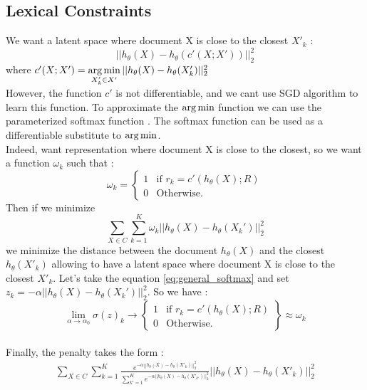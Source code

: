 \subsection{Lexical Constraints}
We want a latent space where document X is close to the closest
$X'_k$ : 
\begin{equation}
|| h_\theta(X) - h_\theta(c'(X ; X' )) ||_2^2
\end{equation}
where $c'(X ; X') = \operatorname*{arg\,min}\limits_{X'_k \in X'} ||h_\theta(X) - h_\theta(X'_k) ||_2^2$\\ 
However, the  function $c'$ is not differentiable, and we cant use SGD algorithm
\cite{doi:10.1080/01621459.1982.10477894}
to learn this function. To approximate the $\operatorname*{arg\,min}$ function we can use the 
parameterized softmax function \cite{doi:10.1117/1.2819119}. The softmax 
function can be used as a differentiable substitute to $\operatorname*{arg\,min}$.
\\Indeed, want representation where document X is close to the closest, so we 
want a function $\omega_k$ such that :
\begin{equation}
\omega_k = \left\{
\begin{array}{ll}
  1 & \mbox{if } r_k = c'(h_\theta(X); R)\\
  0 & \mbox{Otherwise.}
\end{array}
\right.
\end{equation}
Then if we minimize 
\begin{equation}
\sum\limits_{X \in C} \sum\limits_{k = 1}^K \omega_k || h_\theta(X) - 
h_\theta(X_k') ||_2^2
\end{equation}
we minimize the distance between the document $h_\theta(X)$ and the closest 
$h_\theta(X'_k)$ allowing to have a latent space where document X is close to 
the closest $X'_k$.
Let's take the equation \ref{eq:general_softmax} and set $z_k = 
-\alpha|| h_\theta(X) - h_\theta(X_k') ||_2^2$.
So we have :
\begin{equation}
\lim\limits_{\alpha \rightarrow \alpha_0}\sigma(z)_k \rightarrow \left\{
\begin{array}{ll}
  1 & \mbox{if } r_k = c'(h_\theta(X); R)\\
  0 & \mbox{Otherwise.}
\end{array}
\right\} \approx \omega_k
\end{equation}
\\Finally, the penalty takes the form : 
\begin{equation}\label{eq:omega_kw_soft}
\begin{array}{l}
  \sum\limits_{X \in C} \sum\limits_{k = 1}^K \frac{e^{-\alpha|| h_\theta(X) - 
h_\theta(X'_k)||_2^2}}{\sum\limits_{k' = 1}^K e^{-\alpha|| h_\theta(X) - 
h_\theta(X'_{k'})||_2^2}}|| h_\theta(X) - h_\theta(X'_{k})||_2^2
\end{array}
\end{equation}

